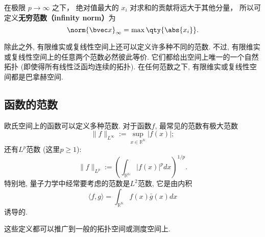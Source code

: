 在极限 $p \to \infty$ 之下， 绝对值最大的 $x_i$ 对求和的贡献将远大于其他分量， 所以可定义\textbf{无穷范数（infinity norm）}为
\begin{equation}
\norm{\bvec x}_\infty = \max \qty{\abs{x_i}}.
\end{equation}

除此之外, 有限维实或复线性空间上还可以定义许多种不同的范数. 不过, 有限维实或复线性空间上的任意两个范数必然彼此等价. 它们都给出空间上唯一的一个自然拓扑 (即使得所有线性泛函均连续的拓扑). 在任何范数之下, 有限维实或复线性空间都是巴拿赫空间.

\subsection{函数的范数}

欧氏空间上的函数可以定义多种范数. 对于函数$f$, 最常见的范数有极大范数
$$
\|f\|_{L^\infty}:=\sup_{x\in\mathbb{R^N}}|f(x)|;
$$
还有$L^p$范数 (这里$p\geq1$):
$$
\|f\|_{L^p}:=\left(\int_{\mathbb{R^N}}|f(x)|^pdx\right)^{1/p}.
$$
特别地, 量子力学中经常要考虑的范数是$L^2$范数, 它是由内积
$$
\langle f,g\rangle=\int_{\mathbb{R^N}}f(x)\bar g(x)dx
$$
诱导的.

这些定义都可以推广到一般的拓扑空间或测度空间上.